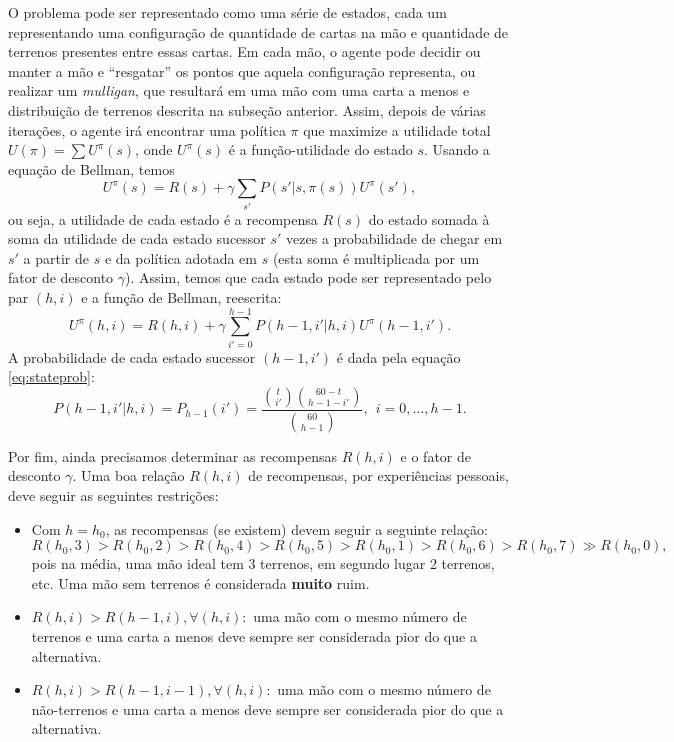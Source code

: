 \documentclass{book}
\begin{document}
O problema pode ser representado como uma série de estados, cada um
representando uma configuração de quantidade de cartas na mão
e quantidade de terrenos presentes entre essas cartas. Em cada mão, o
agente pode decidir ou manter a mão e ``resgatar''
os pontos que aquela configuração representa, ou realizar um
\textit{mulligan}, que resultará em uma mão com uma carta a menos e
distribuição de terrenos descrita na subseção anterior. Assim, depois de
várias iterações, o agente irá encontrar uma política $\pi$
que maximize a utilidade total $U(\pi) = \sum U^\pi(s)$, onde $U^\pi(s)$
é a função-utilidade do estado $s$. Usando a equação de
Bellman, temos \[ U^\pi(s) = R(s) + \gamma\sum\limits_{s'}P(s' | s,
\pi(s))U^\pi(s'),\] ou seja, a utilidade de cada estado é a recompensa
$R(s)$
do estado somada à soma da utilidade de cada estado sucessor $s'$ vezes
a probabilidade de chegar em $s'$ a partir de $s$ e da política adotada
em $s$ (esta soma é multiplicada por um fator de desconto $\gamma$).
Assim, temos que cada estado pode ser representado pelo par $(h, i)$ e a função de Bellman, reescrita:
\begin{equation} \label{eq:mullbellman}U^\pi(h, i) = R(h, i) + \gamma \sum\limits_{i' = 0}^{h - 1}P(h-1, i' | h , i )U^\pi(h - 1, i').\end{equation}
A probabilidade de cada estado sucessor $(h- 1, i')$ é dada pela equação \ref{eq:stateprob}:
\[P(h-1, i' | h, i) = P_{h-1}(i') = \frac{\binom{t}{i'}\binom{60 - t}{h - 1 -
i'}}{\binom{60}{h - 1}}, \ \  i = 0,\ldots, h - 1.\]

Por fim, ainda precisamos determinar as recompensas $R(h, i)$ e o fator de desconto $\gamma$.
Uma boa relação $R(h,i)$ de recompensas, por experiências pessoais, deve seguir as seguintes restrições:
\begin{itemize}
  \item Com $h = h_0$, as recompensas (se existem) devem seguir a seguinte relação:
  \begin{equation} \label{eq:idealhand}R(h_0, 3) > R(h_0, 2) > R(h_0, 4) > R(h_0, 5) > R(h_0, 1) > R(h_0, 6) > R(h_0, 7) \gg R(h_0, 0),\end{equation}
  pois na média, uma mão ideal tem 3 terrenos, em segundo lugar 2 terrenos, etc. Uma mão sem terrenos é considerada \textbf{muito} ruim.
  \item $R(h, i) > R(h - 1, i), \forall (h, i):$ uma mão com o mesmo número de terrenos e uma carta a menos deve sempre ser considerada pior do que a alternativa.
  \item $R(h, i) > R(h - 1, i - 1), \forall (h, i):$ uma mão com o mesmo número de não-terrenos e uma carta a menos deve sempre ser considerada pior do que a alternativa.
\end{itemize}
\end{document}
